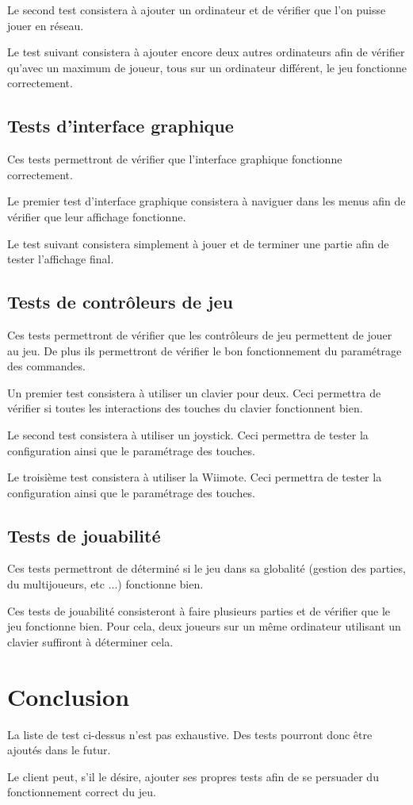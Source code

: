 Le second test consistera à ajouter un ordinateur et de vérifier que l'on puisse jouer en réseau.

Le test suivant consistera à ajouter encore deux autres ordinateurs afin de vérifier qu'avec un maximum de joueur, tous sur un ordinateur différent, le jeu fonctionne correctement.

\subsection{Tests d'interface graphique}

Ces tests permettront de vérifier que l'interface graphique fonctionne correctement.

Le premier test d'interface graphique consistera à naviguer dans les menus afin de vérifier que leur affichage fonctionne.

Le test suivant consistera simplement à jouer et de terminer une partie afin de tester l'affichage final.

\subsection{Tests de contrôleurs de jeu}

Ces tests permettront de vérifier que les contrôleurs de jeu permettent de jouer au jeu. De plus ils permettront de vérifier le bon fonctionnement du paramétrage des commandes.

Un premier test consistera à utiliser un clavier pour deux. Ceci permettra de vérifier si toutes les interactions des touches du clavier fonctionnent bien.

Le second test consistera à utiliser un joystick. Ceci permettra de tester la configuration ainsi que le paramétrage des touches.

Le troisième test consistera à utiliser la Wiimote. Ceci permettra de tester la configuration ainsi que le paramétrage des touches.

\subsection{Tests de jouabilité}

Ces tests permettront de déterminé si le jeu dans sa globalité (gestion des parties, du multijoueurs, etc ...) fonctionne bien.

Ces tests de jouabilité consisteront à faire plusieurs parties et de vérifier que le jeu fonctionne bien. Pour cela, deux joueurs sur un même ordinateur utilisant un clavier suffiront à déterminer cela.

\newpage

\section*{Conclusion}

La liste de test ci-dessus n'est pas exhaustive. Des tests pourront donc être ajoutés dans le futur.

Le client peut, s'il le désire, ajouter ses propres tests afin de se persuader du fonctionnement correct du jeu.